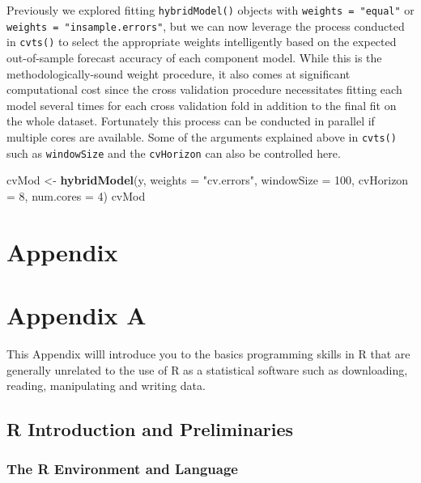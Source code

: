 \documentclass[]{book}
\newenvironment{Shaded}{\begin{snugshade}}{\end{snugshade}}
\newcommand{\KeywordTok}[1]{\textcolor[rgb]{0.13,0.29,0.53}{\textbf{#1}}}
\newcommand{\DataTypeTok}[1]{\textcolor[rgb]{0.13,0.29,0.53}{#1}}
\newcommand{\DecValTok}[1]{\textcolor[rgb]{0.00,0.00,0.81}{#1}}
\newcommand{\StringTok}[1]{\textcolor[rgb]{0.31,0.60,0.02}{#1}}
\newcommand{\NormalTok}[1]{#1}
\begin{document}
Previously we explored fitting \texttt{hybridModel()} objects with
\texttt{weights\ =\ "equal"} or \texttt{weights\ =\ "insample.errors"},
but we can now leverage the process conducted in \texttt{cvts()} to
select the appropriate weights intelligently based on the expected
out-of-sample forecast accuracy of each component model. While this is
the methodologically-sound weight procedure, it also comes at
significant computational cost since the cross validation procedure
necessitates fitting each model several times for each cross validation
fold in addition to the final fit on the whole dataset. Fortunately this
process can be conducted in parallel if multiple cores are available.
Some of the arguments explained above in \texttt{cvts()} such as
\texttt{windowSize} and the \texttt{cvHorizon} can also be controlled
here.

\begin{Shaded}
\begin{Highlighting}[]
\NormalTok{cvMod <-}\StringTok{ }\KeywordTok{hybridModel}\NormalTok{(y, }\DataTypeTok{weights =} \StringTok{"cv.errors"}\NormalTok{, }\DataTypeTok{windowSize =} \DecValTok{100}\NormalTok{,}
                     \DataTypeTok{cvHorizon =} \DecValTok{8}\NormalTok{, }\DataTypeTok{num.cores =} \DecValTok{4}\NormalTok{)}
\NormalTok{cvMod}
\end{Highlighting}
\end{Shaded}

\chapter*{Appendix}\label{appendix}

\chapter{Appendix A}\label{appendix-a}

This Appendix willl introduce you to the basics programming skills in R
that are generally unrelated to the use of R as a statistical software
such as downloading, reading, manipulating and writing data.

\section{R Introduction and
Preliminaries}\label{r-introduction-and-preliminaries}

\subsection{The R Environment and
Language}\label{the-r-environment-and-language}
\end{document}
